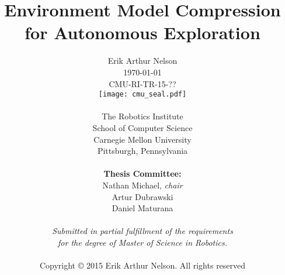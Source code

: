 \author{
        Erik Arthur Nelson \\
        \today \\
        CMU-RI-TR-15-??
  \\
        \texttt{[image: cmu\_seal.pdf]}
  \\
  \\
        The Robotics Institute \\
        School of Computer Science \\
        Carnegie Mellon University \\
        Pittsburgh, Pennsylvania \\
  \\
        {\bf Thesis Committee:} \\
        Nathan Michael, {\it chair} \\
        Artur Dubrawski \\
        Daniel Maturana \\
  \\
        \textit{Submitted in partial fulfillment of the requirements} \\
        \textit{for the degree of Master of Science in Robotics.} \\
  \\
        Copyright \copyright \hspace{2pt} 2015 Erik Arthur Nelson. All rights reserved
}

\title{\bf{
  Environment Model Compression for Autonomous Exploration
}}

\date{}
